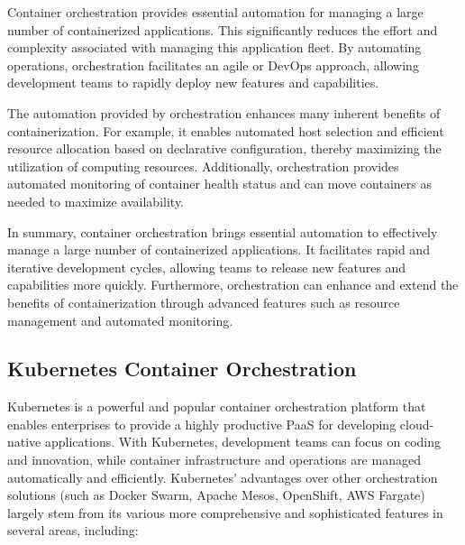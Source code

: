 Container orchestration provides essential automation for managing a large number of containerized applications. This significantly reduces the effort and complexity associated with managing this application fleet. By automating operations, orchestration facilitates an agile or DevOps approach, allowing development teams to rapidly deploy new features and capabilities.

The automation provided by orchestration enhances many inherent benefits of containerization. For example, it enables automated host selection and efficient resource allocation based on declarative configuration, thereby maximizing the utilization of computing resources. Additionally, orchestration provides automated monitoring of container health status and can move containers as needed to maximize availability.

In summary, container orchestration brings essential automation to effectively manage a large number of containerized applications. It facilitates rapid and iterative development cycles, allowing teams to release new features and capabilities more quickly. Furthermore, orchestration can enhance and extend the benefits of containerization through advanced features such as resource management and automated monitoring.

\subsection{Kubernetes Container Orchestration}

Kubernetes is a powerful and popular container orchestration platform that enables enterprises to provide a highly productive PaaS for developing cloud-native applications. With Kubernetes, development teams can focus on coding and innovation, while container infrastructure and operations are managed automatically and efficiently. Kubernetes' advantages over other orchestration solutions (such as Docker Swarm, Apache Mesos, OpenShift, AWS Fargate) largely stem from its various more comprehensive and sophisticated features in several areas, including:

